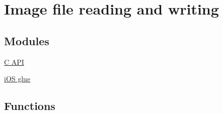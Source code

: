 \hypertarget{group__imgcodecs}{}\section{Image file reading and writing}
\label{group__imgcodecs}
\subsection*{Modules}
\begin{DoxyCompactItemize}
\item 
\hyperlink{group__imgcodecs__c}{C A\+PI}
\item 
\hyperlink{group__imgcodecs__ios}{i\+O\+S glue}
\end{DoxyCompactItemize}
\subsection*{Functions}
